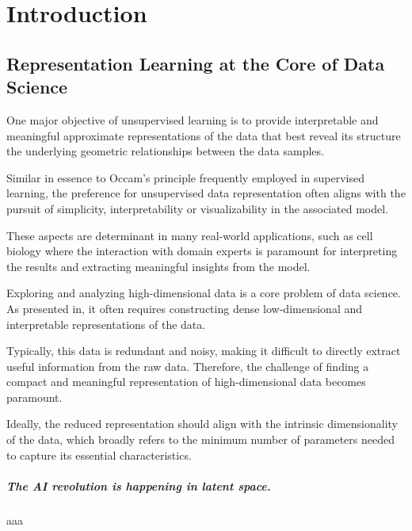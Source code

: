 \chapter{Introduction}\label{chap:intro}

\minitoc

\section{Representation Learning at the Core of Data Science}

One major objective of unsupervised learning \citep{Hastie2009} is to provide interpretable and meaningful approximate representations of the data that best reveal its structure \ie the underlying geometric relationships between the data samples.

Similar in essence to Occam's principle frequently employed in supervised learning, the preference for unsupervised data representation often aligns with the pursuit of simplicity, interpretability or visualizability in the associated model.

These aspects are determinant in many real-world applications, such as cell biology
\citep{regev2017human,kobak2019art,becht2019dimensionality} where the interaction with domain experts is paramount for interpreting the results and extracting meaningful insights from the model. 



Exploring and analyzing high-dimensional data is a core problem of data science. As presented in, it often requires constructing dense low-dimensional and interpretable representations of the data. 


Typically, this data is redundant and noisy, making it difficult to directly extract useful information from the raw data. Therefore, the challenge of finding a compact and meaningful representation of high-dimensional data becomes paramount.




Ideally, the reduced representation should align with the intrinsic dimensionality of the data, which broadly refers to the minimum number of parameters needed to capture its essential characteristics.



\paragraph{The AI revolution is happening in latent space.} aaa


